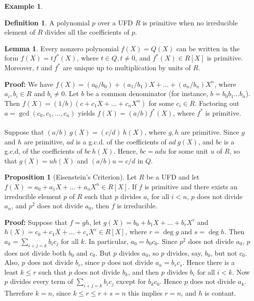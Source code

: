 \documentclass[11pt]{amsbook}%
\theoremstyle{plain}
\theoremstyle{definition}
\newtheorem{definition*}{Definition}
\newtheorem*{example*}{Example}
\newtheorem{lemma}{Lemma}
\newtheorem{proposition}[theorem]{Proposition}
\numberwithin{equation}{section}
\renewcommand{\proof}{ \textbf{Proof: }}
\DeclareMathOperator{\gcd}{gcd}
\begin{document}
\begin{example*}
\begin{definition*}
  A polynomial $p$ over a UFD $R$ is primitive when no irreducible element of $R$ divides
  all the coefficients of $p$.
\end{definition*}

\begin{lemma}
  Every nonzero polynomial $f(X) = Q(X)$ can be written in the form $f(X) = tf^{*}(X)$, where
  $t \in Q, t \neq 0$, and $f^{*}(X) \in R[X]$ is primitive. Moreover, $t$ and $f^{*}$ are
  unique up to multiplication by units of $R$.
\end{lemma} \vspace{1.8em}
\proof We have $f(X) = (a_{0}/b_{0}) + (a_{1}/b_{1})X + \dots + (a_{n}/b_{n})X^{n}$, where
$a_{i}, b_{i} \in R$ and $b_{i} \neq 0$. Let $b$ be a common denominator (for instance, $b = b_{0}b_{1} \dots b_{n}$).
Then $f(X) = (1/b)(c + c_{1}X + \dots + c_{n}X^{n})$ for some $c_{i} \in R$. Factoring
out $a = \gcd(c_{0}, c_{1}, \dots, c_{n})$ yields $f(X) = (a/b)f^{*}(X)$, where $f^{*}$ is primitive. \\ \\
Suppose that $(a/b) \ g(X) = (c/d) \ h(X)$, where $g, h$ are primitive. Since $g$ and $h$ are primitive,
$ad$ is a g.c.d. of the coefficients of $ad \ g(X)$, and $bc$ is a g.c.d, of the coefficients
of $bc \ h(X)$. Hence, $bc = adu$ for some unit $u$ of $R$, so that $g(X) = u  h(X)$ and
$(a/b)u = c/d$ in $Q$. \qedsymbol

\begin{proposition}[Eisenstein's Criterion]
  Let $R$ be a UFD and let $f(X) = a_{0} + a_{1}X + \dots + a_{n}X^{n} \in R[X]$. If $f$ is primitive
  and there exists an irreducible element $p$ of $R$ such that $p$ divides $a_{i}$ for all $i < n$,
  $p$ does not divide $a_{n}$, and $p^{2}$ does not divide $a_{0}$, then $f$ is irreducible.
\end{proposition} \vspace{1.8em}
\proof Suppose that $f = gh$, let $g(X) = b_{0} + b_{1}X + \dots + b_{r}X^{r}$ and $h(X) = c_{0} + c_{1}X + \dots + c_{s}X^{s} \in R[X]$,
where $r = \deg g$ and $s = \deg h$. Then $a_{k} = \sum_{i+j=k} b_{i}c_{j}$ for all $k$. In particular,
$a_{0} = b_{0}c_{0}$. Since $p^{2}$ does not divide $a_{0}$, $p$ does not divide both $b_{0}$ and $c_{0}$.
But $p$ divides $a_{0}$, so $p$ divides, say, $b_{0}$, but not $c_{0}$. Also, $p$ does not divide $b_{r}$,
since $p$ does not divide $a_{n} = b_{r}c_{s}$. Hence there is a least $k \leq r$ such that $p$ does not divide
$b_{k}$, and then $p$ divides $b_{i}$ for all $i < k$. Now $p$ divides
every term of $\sum_{i+j=k} b_{i}c_{j}$ except for $b_{k}c_{0}$. Hence $p$ does not divide $a_{k}$.
Therefore $k = n$, since $k \leq r \leq r+s = n$ this implies $r = n$, and $h$ is contant. \qedsymbol


\end{example*}
\end{document}
